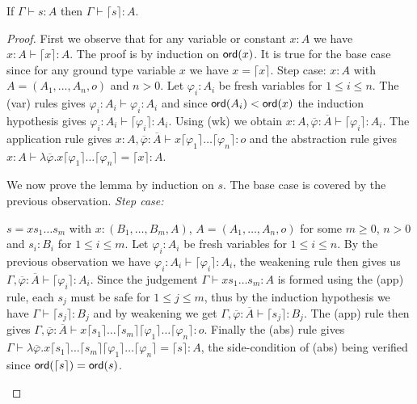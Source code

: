 \documentclass{llncs}
\newcommand{\elnf}[1]{\lceil #1\rceil} %
\newcommand\ord[1]{{\sf
    ord}(#1)} \newcommand\typear{\rightarrow}
\begin{document}
\begin{lemma}
\label{lem:elnf_preserves_safety}
If $\Gamma \vdash s :A$ then $\Gamma \vdash \elnf{s} :A$.
\end{lemma}
\begin{proof}

  First we observe that for any variable or constant $x:A$ we have $x:A
  \vdash \elnf{x} :A$. The proof is by induction on $\ord{x}$. It is true for the base case since
for any ground type variable $x$ we have $x = \elnf{x}$. Step
  case: $x:A$ with $A=(A_1, \ldots, A_n,o)$ and $n>0$. Let $\varphi_i:A_i$ be
  fresh variables for $1\leq i\leq n$. The (var) rules gives
  $\varphi_i :A_i \vdash \varphi_i : A_i$ and since $\ord{A_i} < \ord{x}$ the
  induction hypothesis gives $\varphi_i :A_i \vdash
  \elnf{\varphi_i} : A_i$. Using (wk) we obtain $x:A, \overline{\varphi} : \overline{A}
  \vdash \elnf{\varphi_i} :A_i$.  The application rule gives $x :A, \overline{\varphi} : \overline{A} \vdash x \elnf{\varphi_1} \ldots \elnf{\varphi_n}
  : o$ and the abstraction rule gives $ x :A \vdash \lambda
  \overline{\varphi} . x \elnf{\varphi_1} \ldots \elnf{\varphi_n} =
  \elnf{x} :A$.


We now prove the lemma by induction on $s$.
The base case is covered by the previous observation.
\emph{Step case:}
\begin{compactitem}
\item $s = x s_1 \ldots s_m$ with $x: (B_1, \ldots, B_m, A)$, $A = (A_1, \ldots, A_n, o)$ for some $m\geq 0$, $n>0$ and $s_i : B_i$ for $1 \leq i \leq
  m$.  Let $\varphi_i: A_i$ be fresh variables for $1\leq i \leq
  n$. By the previous observation we have $\varphi_i :A_i \vdash \elnf{\varphi_i} :A_i$, the weakening rule then gives us $\Gamma , \overline{\varphi} : \overline{A}
  \vdash \elnf{\varphi_i} : A_i$.  Since the judgement
  $\Gamma \vdash x s_1 \ldots s_m : A$ is formed using the {\sf (app)} rule, each $s_j$ must be safe for $1\leq j \leq m$, thus by the induction hypothesis we have $\Gamma \vdash \elnf{s_j} : B_j$ and by weakening we get $\Gamma, \overline{\varphi} :\overline{A} \vdash \elnf{s_j} : B_j$.  The {\sf(app)}
  rule then gives $\Gamma, \overline{\varphi} :\overline{A} \vdash x \elnf{s_1} \ldots \elnf{s_m} \elnf{\varphi_1} \ldots \elnf{\varphi_n} : o$. Finally
  the {\sf (abs)} rule gives $\Gamma \vdash \lambda \overline{\varphi} . x
  \elnf{s_1} \ldots \elnf{s_m} \elnf{\varphi_1} \ldots
  \elnf{\varphi_n} = \elnf{s} : A$, the side-condition of {\sf (abs)} being verified since $\ord{\elnf{s}} = \ord{s}$.



\end{compactitem}
\end{proof}
\end{document}
